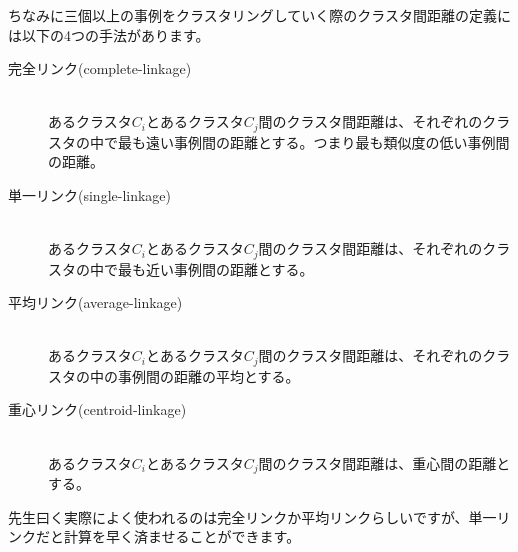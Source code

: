 \documentclass[uplatex]{jsarticle}
\begin{document}
ちなみに三個以上の事例をクラスタリングしていく際のクラスタ間距離の定義には以下の4つの手法があります。
\begin{description}
  \item [完全リンク(complete-linkage)]\mbox{}\\
  あるクラスタ$C_i$とあるクラスタ$C_j$間のクラスタ間距離は、それぞれのクラスタの中で最も遠い事例間の距離とする。つまり最も類似度の低い事例間の距離。
  \item [単一リンク(single-linkage)]\mbox{}\\
  あるクラスタ$C_i$とあるクラスタ$C_j$間のクラスタ間距離は、それぞれのクラスタの中で最も近い事例間の距離とする。
  \item [平均リンク(average-linkage)]\mbox{}\\
  あるクラスタ$C_i$とあるクラスタ$C_j$間のクラスタ間距離は、それぞれのクラスタの中の事例間の距離の平均とする。
  \item [重心リンク(centroid-linkage)]\mbox{}\\
  あるクラスタ$C_i$とあるクラスタ$C_j$間のクラスタ間距離は、重心間の距離とする。
\end{description}
先生曰く実際によく使われるのは完全リンクか平均リンクらしいですが、単一リンクだと計算を早く済ませることができます。



\end{document}
